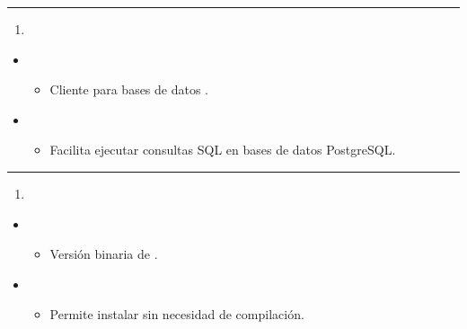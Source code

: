 \documentclass[a4paper,10pt,spanish]{sphinxmanual}
\begin{document}
\bigskip\hrule\bigskip

\begin{enumerate}
%
\setcounter{enumi}{18}
\item {} 
\sphinxAtStartPar
{}

\end{enumerate}
\begin{itemize}
\item {} 
\sphinxAtStartPar
{}
\begin{itemize}
\item {} 
\sphinxAtStartPar
Cliente para bases de datos .

\end{itemize}

\item {} 
\sphinxAtStartPar
{}
\begin{itemize}
\item {} 
\sphinxAtStartPar
Facilita ejecutar consultas SQL en bases de datos PostgreSQL.

\end{itemize}

\end{itemize}


\bigskip\hrule\bigskip

\begin{enumerate}
%
\setcounter{enumi}{19}
\item {} 
\sphinxAtStartPar
{}

\end{enumerate}
\begin{itemize}
\item {} 
\sphinxAtStartPar
{}
\begin{itemize}
\item {} 
\sphinxAtStartPar
Versión binaria de .

\end{itemize}

\item {} 
\sphinxAtStartPar
{}
\begin{itemize}
\item {} 
\sphinxAtStartPar
Permite instalar  sin necesidad de compilación.

\end{itemize}

\end{itemize}
\end{document}
